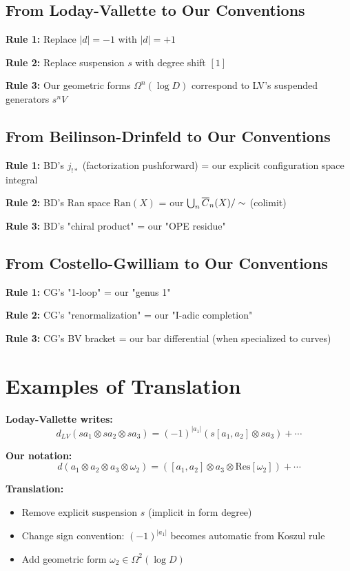 \subsection{From Loday-Vallette to Our Conventions}

\textbf{Rule 1:} Replace $|d| = -1$ with $|d| = +1$

\textbf{Rule 2:} Replace suspension $s$ with degree shift $[1]$

\textbf{Rule 3:} Our geometric forms $\Omega^n(\log D)$ correspond to LV's suspended generators $s^n V$

\subsection{From Beilinson-Drinfeld to Our Conventions}

\textbf{Rule 1:} BD's $j_{!*}$ (factorization pushforward) = our explicit configuration space integral

\textbf{Rule 2:} BD's Ran space $\text{Ran}(X)$ = our $\bigcup_n \overline{C}_{n}(X) / \sim$ (colimit)

\textbf{Rule 3:} BD's "chiral product" = our "OPE residue"

\subsection{From Costello-Gwilliam to Our Conventions}

\textbf{Rule 1:} CG's "1-loop" = our "genus 1"

\textbf{Rule 2:} CG's "renormalization" = our "I-adic completion"

\textbf{Rule 3:} CG's BV bracket = our bar differential (when specialized to curves)

\section{Examples of Translation}

\begin{example}
\textbf{Loday-Vallette writes:}
$$d_{LV}(s a_1 \otimes s a_2 \otimes s a_3) = (-1)^{|a_1|} (s[a_1, a_2] \otimes s a_3) + \cdots$$

\textbf{Our notation:}
$$d(a_1 \otimes a_2 \otimes a_3 \otimes \omega_2) = ([a_1, a_2] \otimes a_3 \otimes \text{Res}[\omega_2]) + \cdots$$

\textbf{Translation:}
\begin{itemize}
\item Remove explicit suspension $s$ (implicit in form degree)
\item Change sign convention: $(-1)^{|a_1|}$ becomes automatic from Koszul rule
\item Add geometric form $\omega_2 \in \Omega^2(\log D)$
\end{itemize}
\end{example}

